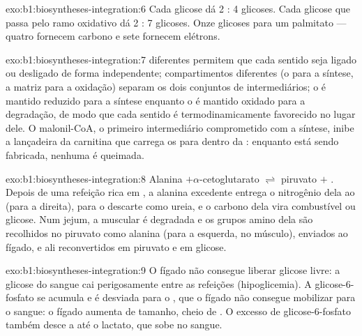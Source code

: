 \begin{solution}{exo:b1:biosyntheses-integration:6}
Cada glicose dá 2 : 4 glicoses. Cada glicose que passa pelo
ramo oxidativo dá 2 : 7 glicoses. Onze glicoses para um palmitato
--- quatro fornecem carbono e sete fornecem elétrons.
\end{solution}

\begin{solution}{exo:b1:biosyntheses-integration:7}
 diferentes permitem que cada sentido seja ligado ou desligado de
forma independente; compartimentos diferentes (o  para a síntese,
a matriz para a oxidação) separam os dois conjuntos de intermediários; o
 é mantido reduzido para a síntese enquanto o  é mantido oxidado
para a degradação, de modo que cada sentido é termodinamicamente
favorecido no lugar dele. O malonil-CoA, o primeiro intermediário
comprometido com a síntese, inibe a lançadeira da carnitina que carrega
os  para dentro da : enquanto  está sendo
fabricada, nenhuma é queimada.
\end{solution}

\begin{solution}{exo:b1:biosyntheses-integration:8}
Alanina $+ \alpha$-cetoglutarato $\rightleftharpoons$ piruvato $+$
. Depois de uma refeição rica em , a alanina excedente
entrega o nitrogênio dela ao  (para a direita), para o descarte
como ureia, e o carbono dela vira combustível ou glicose. Num jejum, a
 muscular é degradada e os grupos amino dela são recolhidos no
piruvato como alanina (para a esquerda, no músculo), enviados ao fígado,
e ali reconvertidos em piruvato e em glicose.
\end{solution}

\begin{solution}{exo:b1:biosyntheses-integration:9}
O fígado não consegue liberar glicose livre: a glicose do sangue cai
perigosamente entre as refeições (hipoglicemia). A glicose-6-fosfato se
acumula e é desviada para o , que o fígado não consegue
mobilizar para o sangue: o fígado aumenta de tamanho, cheio de
. O excesso de glicose-6-fosfato também desce a  até
o lactato, que sobe no sangue.
\end{solution}


